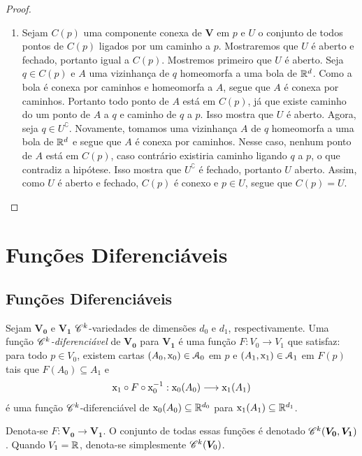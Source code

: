 \begin{proof}
\begin{enumerate}
	\item Sejam $C(p)$ uma componente conexa de $\bm V$ em $p$ e $U$ o conjunto de todos pontos de $C(p)$ ligados por um caminho a $p$. Mostraremos que $U$ é aberto e fechado, portanto igual a $C(p)$. Mostremos primeiro que $U$ é aberto. Seja $q \in C(p)$ e $A$ uma vizinhança de $q$ homeomorfa a uma bola de $\mathbb{R}^d$. Como a bola é conexa por caminhos e homeomorfa a $A$, segue que $A$ é conexa por caminhos. Portanto todo ponto de $A$ está em $C(p)$, já que existe caminho do um ponto de $A$ a $q$ e caminho de $q$ a $p$. Isso mostra que $U$ é aberto. Agora, seja $q \in U^\complement$. Novamente, tomamos uma vizinhança $A$ de $q$ homeomorfa a uma bola de $\mathbb{R}^d$ e segue que $A$ é conexa por caminhos. Nesse caso, nenhum ponto de $A$ está em $C(p)$, caso contrário existiria caminho ligando $q$ a $p$, o que contradiz a hipótese. Isso mostra que $U^\complement$ é fechado, portanto $U$ aberto. Assim, como $U$ é aberto e fechado, $C(p)$ é conexo e $p \in U$, segue que $C(p)=U$.
		\end{enumerate}
\end{proof}

\section{Funções Diferenciáveis}

\subsection{Funções Diferenciáveis}

\begin{defi}
Sejam $\bm{V_0}$ e $\bm{V_1}$ $\mathscr{C}^k$-variedades de dimensões $d_0$ e $d_1$, respectivamente. Uma função \emph{$\mathscr{C}^k$-diferenciável} de $\bm{V_0}$ para $\bm{V_1}$ é uma função
 $F\colon V_0 \to V_1$ que satisfaz: para todo $p \in V_0$, existem cartas $(A_0,\mathrm{x}_0) \in \mathcal{A}_0$ em $p$ e $(A_1,\mathrm{x}_1) \in \mathcal{A}_1$ em $F(p)$ tais que $F(A_0) \subseteq A_1$ e
		\begin{equation*}
		\mathrm{x}_1 \circ F \circ \mathrm{x}_0^{-1}: \mathrm{x}_0(A_0) \longrightarrow \mathrm{x}_1(A_1)
		\end{equation*}
é uma função $\mathscr{C}^k$-diferenciável de $\mathrm{x}_0(A_0) \subseteq \mathbb{R}^{d_0}$ para $\mathrm{x}_1(A_1) \subseteq \mathbb{R}^{d_1}$.

Denota-se $F\colon \bm{V_0} \to \bm{V_1}$. O conjunto de todas essas funções é denotado $\mathscr{C}^k(\bm{V_0},\bm{V_1})$. Quando $V_1=\mathbb{R}$, denota-se simplesmente $\mathscr{C}^k(\bm V_0)$.
\end{defi}

